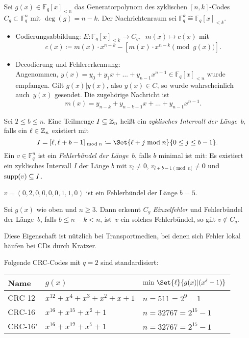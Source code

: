 \documentclass{cheat-sheet}
\newcommand{\F}{\mathbb{F}} %
\newcommand{\divides}{|} %
\begin{document}
\begin{verf}
  Sei $g(x) \in \F_q[x]_{< n}$ das Generatorpolynom des zyklischen $[n, k]$-Codes $C_g \subset \F_q^n$ mit $\deg(g) = n - k$.
  Der Nachrichtenraum sei $\F_q^k \hat{=} \F_q[x]_{< k}$.
  \begin{itemize}
    \item Codierungsabbildung: \enspace $E : \F_q[x]_{< k} \to C_g, \enspace m(x) \mapsto c(x)$ \enspace mit
    \[
      c(x) \coloneqq m(x) \cdot x^{n-k} - [ m(x) \cdot x^{n-k} \pmod{g(x)} ].
    \]
    \item Decodierung und Fehlererkennung: \\
    Angenommen, $y(x) = y_0 + y_1 x + \ldots + y_{n-1} x^{n-1} \in \F_q[x]_{< n}$ wurde empfangen.
    Gilt $g(x) \divides y(x)$, also $y(x) \in C$, so wurde wahrscheinlich auch~$y(x)$ gesendet.
    Die zugehörige Nachricht ist
    \[
      m(x) = y_{n-k} + y_{n-k+1} x + \ldots + y_{n-1} x^{n-1}.
    \]
  \end{itemize}
\end{verf}

\begin{defn}
  Sei $2 \leq b \leq n$.
  Eine Teilmenge $I \subseteq \mathbb{Z}_n$ heißt ein \emph{zyklisches Intervall der Länge~$b$}, falls ein $\ell \in \mathbb{Z}_n$ existiert mit
  \[
    I = [\ell, \ell + b - 1]_{\bmod n} \coloneqq \Set{\ell + j \bmod n}{0 \leq j \leq b-1}.
  \]
  Ein $v \in \F_q^n$ ist ein \emph{Fehlerbündel der Länge~$b$}, falls $b$ minimal ist mit:
  Es existiert ein zyklisches Intervall $I$ der Länge $b$ mit $v_l \neq 0$, $v_{l+b-1 \pmod{n}} \neq 0$ und $\operatorname{supp}(v) \subseteq I$.
\end{defn}

\begin{bsp}
  $v = (0,2,0,0,0,0,1,1,0)$ ist ein Fehlerbündel der Länge $b = 5$.
\end{bsp}

\begin{prop}
  Sei $g(x)$ wie oben und $n \geq 3$.
  Dann erkennt $C_g$ \textit{Einzelfehler} und Fehlerbündel der Länge~$b$, falls $b \leq n - k < n$, \dh{} ist~$v$ ein solches Fehlerbündel, so gilt $v \not\in C_g$.
\end{prop}

\begin{bem}
  Diese Eigenschaft ist nützlich bei Transportmedien, bei denen sich Fehler lokal häufen \zB{} bei CDs durch Kratzer.
\end{bem}

\begin{bspe}
  Folgende CRC-Codes mit $q = 2$ sind standardisiert:

  \begin{tabular}{l | l | l}
    Name & $g(x)$ & $\min \, \Set{\ell}{g(x) \divides (x^\ell - 1)}$ \\ \hline
    CRC-12 & $x^{12} + x^4 + x^3 + x^2 + x + 1$ & $n = 511 = 2^9 - 1$ \\
    CRC-16 & $x^{16} + x^{15} + x^2 + 1$ & $n = 32767 = 2^{15} - 1$ \\
    CRC-16' & $x^{16} + x^{12} + x^5 + 1$ & $n = 32767 = 2^{15} - 1$
  \end{tabular}
\end{bspe}
\end{document}
